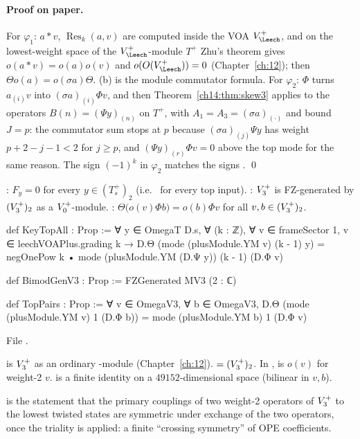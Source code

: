 \paragraph{Proof on paper.}  For $\varphi_1$: $a*v$, $\operatorname{Res}_k(a,v)$ are computed inside the VOA
$V_\Leech^+$, and on the lowest-weight space of the $V_\Leech^+$-module $T^+$ Zhu's theorem gives
$o(a*v)=o(a)o(v)$ and $o(O(V_\Leech^+))=0$ (Chapter~\ref{ch:12}); then $\Theta o(a)=o(\sigma a)\Theta$.
(b) is the module commutator formula.  For $\varphi_2$: $\Phi$ turns $a_{(i)}v$ into $(\sigma a)_{(i)}\Phi v$, and
then Theorem~\ref{ch14:thm:skew3} applies to the operators $B(n)=(\Psi y)_{(n)}$ on $T^+$, with
$A_1=A_3=(\sigma a)_{(\cdot)}$ and bound $J=p$: the commutator sum stops at $p$ because
$(\sigma a)_{(j)}\Psi y$ has weight $p+2-j-1<2$ for $j\ge p$, and $(\Psi y)_{(r)}\Phi v=0$ above the top mode
for the same reason.  The sign $(-1)^k$ in $\varphi_2$ matches the signs . \qed

\begin{definition}\label{ch14:def:toppairs}
: $F_y=0$ for every $y\in(T_s^+)_2$ (i.e.\  for every top input).
: $V_3^{+}$ is FZ-generated by $(V_3^{+})_2$ as a $V_0^{+}$-module.
: $\Theta\bigl(o(v)\Phi b\bigr)=o(b)\Phi v$ for all $v,b\in(V_3^{+})_2$.
\end{definition}
\begin{leancode}
def KeyTopAll : Prop :=
  ∀ y ∈ OmegaT D.s, ∀ (k : ℤ), ∀ v ∈ frameSector 1, v ∈ leechVOAPlus.grading k →
    D.Θ (mode (plusModule.YM v) (k - 1) y)
      = negOnePow k • mode (plusModule.YM (D.Ψ y)) (k - 1) (D.Φ v)

def BimodGenV3 : Prop := FZGenerated MV3 (2 : ℂ)

def TopPairs : Prop :=
  ∀ v ∈ OmegaV3, ∀ b ∈ OmegaV3,
    D.Θ (mode (plusModule.YM v) 1 (D.Φ b)) = mode (plusModule.YM b) 1 (D.Φ v)
\end{leancode}
File .

\begin{dictionary}
 is $V_3^{+}$ as an ordinary -module (Chapter~\ref{ch:12}).   $=(V_3^{+})_2$.
In ,  is $o(v)$ for weight-2 $v$.   is a finite
identity on a $49152$-dimensional space (bilinear in $v,b$).
\end{dictionary}

\begin{physics}
 is the statement that the primary couplings of two weight-2 operators of $V_3^{+}$ to
the lowest twisted states are symmetric under exchange of the two operators, once the triality is
applied: a finite ``crossing symmetry'' of OPE coefficients.
\end{physics}

